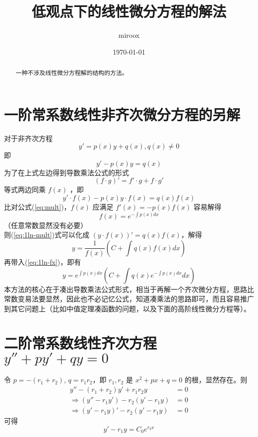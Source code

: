 \documentclass[UTF8]{ctexart}
\title{低观点下的线性微分方程的解法}
\author{miroox}
\date{\today}
\newcommand\mathe{\mathit{e}}
\begin{document}
\maketitle
\begin{abstract} 
一种不涉及线性微分方程解的结构的方法。
\end{abstract} 

\section{一阶常系数线性非齐次微分方程的另解} \label{sec:1ln}
	对于非齐次方程
	\begin{equation}
		y'=p(x)y+q(x),q(x)\neq0 \label{eq:1ln-org}
	\end{equation}
	即
	\begin{equation}
		y'-p(x)y=q(x) \label{eq:1ln-mov}
	\end{equation}
	为了在上式左边得到导数乘法公式的形式 
	\begin{equation}
		(f\cdot g)'=f'\cdot g+f\cdot g' \label{eq:mult}
	\end{equation}
	等式两边同乘 $f(x)$ ，即
	\begin{equation}
		y'\cdot f(x)-p(x)y\cdot f(x)=q(x)f(x) \label{eq:1ln-mult}
	\end{equation}
	比对公式(\ref{eq:mult})，$f(x)$ 应满足 $f'(x)=-p(x)f(x)$
	容易解得
	\begin{equation}
		f(x)=\mathe^{-\int p(x)dx} \label{eq:1ln-fx}
	\end{equation}
	（任意常数显然没有必要） \\
	则(\ref{eq:1ln-mult})式可以化成 $(y\cdot f(x))'=q(x)f(x)$，解得
	\begin{equation}
		y=\frac{1}{f(x)}(C+\int q(x)f(x)dx) \label{eq:1ln-yNoExpand}
	\end{equation}
	再带入(\ref{eq:1ln-fx})，即有
	\begin{equation}
		y=\mathe^{\int p(x)dx}(C+\int q(x)\mathe^{-\int p(x)dx}dx) \label{eq:1ln-result}
	\end{equation}
	本方法的核心在于凑出导数乘法公式形式，相当于再解一个齐次微分方程，思路比常数变易法要显然，因此也不必记忆公式，知道凑乘法的思路即可，而且容易推广到其它问题上（比如中值定理凑函数的问题，以及下面的高阶线性微分方程等）。

\section{二阶常系数线性齐次方程 $y''+py'+qy=0$ } \label{sec:2lh}
	令 $p=-(r_{1}+r_{2})$, $q=r_{1}r_{2}$，即 $r_{1}, r_{2}$ 是 $x^{2}+px+q=0$ 的根，显然存在。则
	\begin{align}
		y''-(r_{1}+r_{2})y'+r_{1}r_{2}y&=0 \label{eq:2lh-repr} \\
		\Rightarrow (y''-r_{1}y')-r_{2}(y'-r_{1}y)&=0 \\
		\Rightarrow (y'-r_{1}y)'-r_{2}(y'-r_{1}y)&=0
	\end{align}
	可得
	\begin{equation}
		y'-r_{1}y=C_{0}\mathe^{r_{2}x} \label{eq:2lh-1stInt}
	\end{equation}
\end{document}

